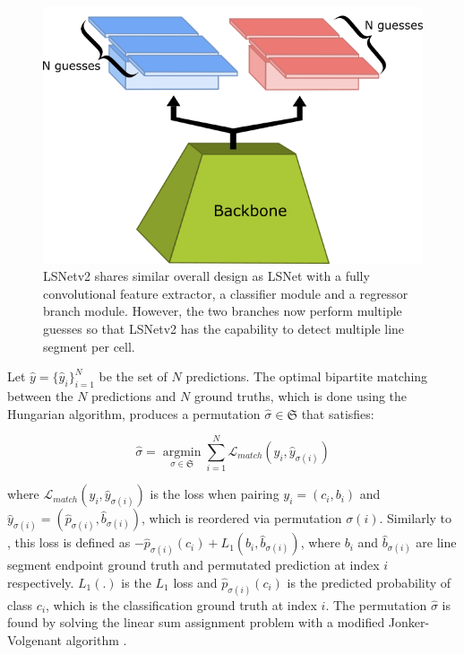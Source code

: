 \documentclass[journal]{IEEEtran}
\begin{document}
\begin{figure}
  \includegraphics[width=\linewidth]{imgs/others/lsnet_arch.png}
  \caption{LSNetv2 shares similar overall design as LSNet with a fully convolutional feature extractor, a classifier module and a regressor branch module. However, the two branches now perform multiple guesses so that LSNetv2 has the capability to detect multiple line segment per cell.}
  \label{lsnet_architecture}
\end{figure}

Let $\hat{y}=\{\hat{y}_i\}^N_{i=1}$ be the set of $N$ predictions. The optimal bipartite matching between the $N$ predictions and $N$ ground truths, which is done using the Hungarian algorithm, produces a permutation $\hat{\sigma} \in \mathfrak{S}$ that satisfies:

\begin{equation} \label{bipartite_eqn}
\hat{\sigma} = \mathop{\arg \min}\limits_{\sigma \in \mathfrak{S}} \sum_{i=1}^N \mathcal{L}_{match} (y_i, \hat{y}_{\sigma(i)})
\end{equation}

\noindent where $\mathcal{L}_{match} (y_i, \hat{y}_{\sigma(i)})$ is the loss when pairing $y_i = (c_i, b_i)$ and $\hat{y}_{\sigma(i)} = (\hat{p}_{\sigma(i)}, \hat{b}_{\sigma(i)})$, which is reordered via permutation $\sigma(i)$. Similarly to \cite{DETR}, this loss is defined as $-\hat{p}_{\sigma(i)}(c_i) + L_1(b_i, \hat{b}_{\sigma(i)})$, where $b_i$ and $\hat{b}_{\sigma(i)}$ are line segment endpoint ground truth and permutated prediction at index $i$ respectively. $L_1(.)$ is the $L_1$ loss and $\hat{p}_{\sigma(i)}(c_i)$ is the predicted probability of class $c_i$, which is the classification ground truth at index $i$. The permutation $\hat{\sigma}$ is found by solving the linear sum assignment problem with a modified Jonker-Volgenant algorithm \cite{7738348}.
\end{document}
